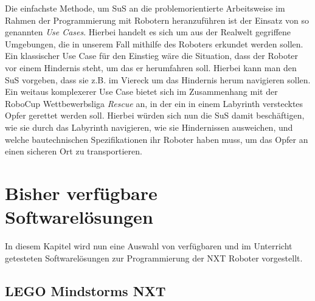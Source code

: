 \documentclass[paper=a4, pagesize, DIV=calc, BCOR=12.5mm, twoside=on, onecolumn=on, open = any, titlepage =on, parskip =half-, headsepline = on, footsepline = on, chapterprefix = on, appendixprefix = off, fontsize = 12pt, numbers = noenddot, abstract = on]{scrbook}
\numberwithin{equation}{chapter}
\theoremstyle{definition}
\theoremstyle{plain}
\theoremstyle{plain}
\theoremstyle{remark}
\theoremstyle{plain}
\theoremstyle{plain}
\begin{document}
Die einfachste Methode, um SuS an die problemorientierte Arbeitsweise im Rahmen der Programmierung mit Robotern heranzuführen ist der Einsatz von so genannten \emph{Use Cases}. Hierbei handelt es sich um aus der Realwelt gegriffene Umgebungen, die in unserem Fall mithilfe des Roboters erkundet werden sollen. Ein klassischer Use Case für den Einstieg wäre die Situation, dass der Roboter vor einem Hindernis steht, um das er herumfahren soll. Hierbei kann man den SuS vorgeben, dass sie z.B. im Viereck um das Hindernis herum navigieren sollen.\\
Ein weitaus komplexerer Use Case bietet sich im Zusammenhang mit der RoboCup Wettbewerbsliga \emph{Rescue} an, in der ein in einem Labyrinth verstecktes Opfer gerettet werden soll. Hierbei würden sich nun die SuS damit beschäftigen, wie sie durch das Labyrinth navigieren, wie sie Hindernissen ausweichen, und welche bautechnischen Spezifikationen ihr Roboter haben muss, um das Opfer an einen sicheren Ort zu transportieren.

\section{Bisher verfügbare Softwarelösungen}
\label{sec:software bisher}
In diesem Kapitel wird nun eine Auswahl von verfügbaren und im Unterricht getesteten Softwarelösungen zur Programmierung der NXT Roboter vorgestellt.

\subsection{LEGO Mindstorms NXT}
\label{sec:LMNXT}
\end{document}
